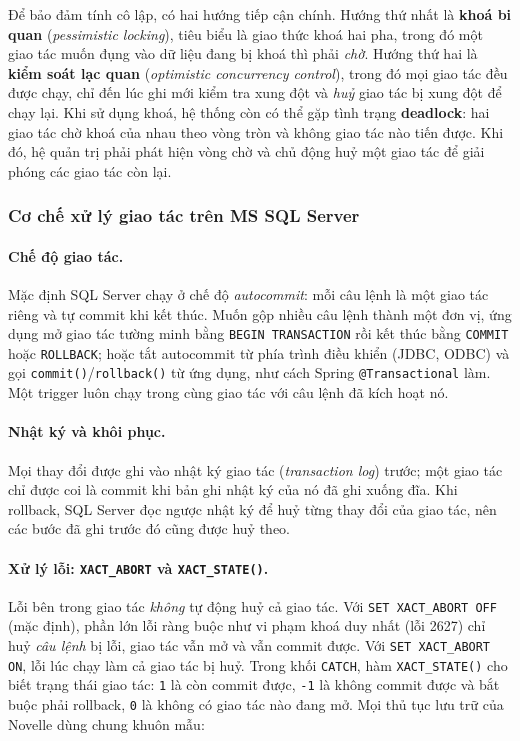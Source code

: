 Để bảo đảm tính cô lập, có hai hướng tiếp cận chính. Hướng thứ nhất là \textbf{khoá bi quan} (\emph{pessimistic locking}), tiêu biểu là giao thức khoá hai pha, trong đó một giao tác muốn đụng vào dữ liệu đang bị khoá thì phải \emph{chờ}. Hướng thứ hai là \textbf{kiểm soát lạc quan} (\emph{optimistic concurrency control}), trong đó mọi giao tác đều được chạy, chỉ đến lúc ghi mới kiểm tra xung đột và \emph{huỷ} giao tác bị xung đột để chạy lại. Khi sử dụng khoá, hệ thống còn có thể gặp tình trạng \textbf{deadlock}: hai giao tác chờ khoá của nhau theo vòng tròn và không giao tác nào tiến được. Khi đó, hệ quản trị phải phát hiện vòng chờ và chủ động huỷ một giao tác để giải phóng các giao tác còn lại.

\subsubsection{Cơ chế xử lý giao tác trên MS SQL Server}
\label{subsubsec:tx-mssql}

\paragraph{Chế độ giao tác.} Mặc định SQL Server chạy ở chế độ \emph{autocommit}: mỗi câu lệnh là một giao tác riêng và tự commit khi kết thúc. Muốn gộp nhiều câu lệnh thành một đơn vị, ứng dụng mở giao tác tường minh bằng \texttt{BEGIN TRANSACTION} rồi kết thúc bằng \texttt{COMMIT} hoặc \texttt{ROLLBACK}; hoặc tắt autocommit từ phía trình điều khiển (JDBC, ODBC) và gọi \texttt{commit()}/\texttt{rollback()} từ ứng dụng, như cách Spring \texttt{@Transactional} làm. Một trigger luôn chạy trong cùng giao tác với câu lệnh đã kích hoạt nó.

\paragraph{Nhật ký và khôi phục.} Mọi thay đổi được ghi vào nhật ký giao tác (\emph{transaction log}) trước; một giao tác chỉ được coi là commit khi bản ghi nhật ký của nó đã ghi xuống đĩa. Khi rollback, SQL Server đọc ngược nhật ký để huỷ từng thay đổi của giao tác, nên các bước đã ghi trước đó cũng được huỷ theo.

\paragraph{Xử lý lỗi: \texttt{XACT\_ABORT} và \texttt{XACT\_STATE()}.} Lỗi bên trong giao tác \emph{không} tự động huỷ cả giao tác. Với \texttt{SET XACT\_ABORT OFF} (mặc định), phần lớn lỗi ràng buộc như vi phạm khoá duy nhất (lỗi 2627) chỉ huỷ \emph{câu lệnh} bị lỗi, giao tác vẫn mở và vẫn commit được. Với \texttt{SET XACT\_ABORT ON}, lỗi lúc chạy làm cả giao tác bị huỷ. Trong khối \texttt{CATCH}, hàm \texttt{XACT\_STATE()} cho biết trạng thái giao tác: \texttt{1} là còn commit được, \texttt{-1} là không commit được và bắt buộc phải rollback, \texttt{0} là không có giao tác nào đang mở. Mọi thủ tục lưu trữ của Novelle dùng chung khuôn mẫu:

